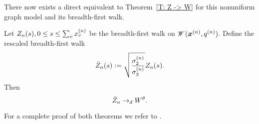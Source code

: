 There now exists a direct equivalent to Theorem~\ref{T: Z -> W} for this nonuniform graph model and its breadth-first walk.

\begin{theorem} \label{T: Z -> W nonu}
	Let $Z_n(s), 0 \leq s \leq \sum_{v} x^{(n)}_v$ be the breadth-first walk on $\mathscr{W}(\boldsymbol{x}^{(n)}, q^{(n)})$.
	Define the rescaled breadth-first walk
	\begin{equation}
		\bar{Z}_n(s) := \sqrt{\frac{\sigma^{(n)}_2}{\sigma^{(n)}_3}} Z_n(s).
	\end{equation}
	Then
	\begin{equation}
		\bar{Z}_n \rightarrow_d W^{\theta}.
	\end{equation}	
\end{theorem}

For a complete proof of both theorems we refer to \cite[p.828ff.]{Aldous.1997}.
